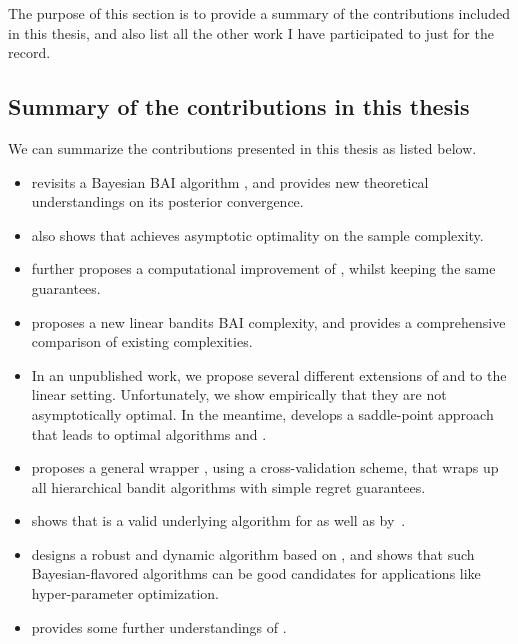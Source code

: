 The purpose of this section is to provide a summary of the contributions included in this thesis, and also list all the other work I have participated to just for the record.

\subsection{Summary of the contributions in this thesis}\label{sec:intro.contributions.summary}

We can summarize the contributions presented in this thesis as listed below.

\begin{itemize}[label=]
    \item \cite{shang2020t3c} revisits a Bayesian BAI algorithm \TTTS, and provides new theoretical understandings on its posterior convergence.
    \item \cite{shang2020t3c} also shows that \TTTS achieves asymptotic optimality on the sample complexity.
    \item \cite{shang2020t3c} further proposes a computational improvement \TCC of \TTTS, whilst keeping the same guarantees.
    \item \cite{degenne2020game} proposes a new linear bandits BAI complexity, and provides a comprehensive comparison of existing complexities.
    \item In an unpublished work, we propose several different extensions of \TTTS and \TCC to the linear setting. Unfortunately, we show empirically that they are not asymptotically optimal. In the meantime, \cite{degenne2020game} develops a saddle-point approach that leads to optimal algorithms \LG and \LGC.
    \item \cite{shang2019adaptive} proposes a general wrapper \GPO, using a cross-validation scheme, that wraps up all hierarchical bandit algorithms with simple regret guarantees.
    \item \cite{shang2018adaptive} shows that \HCT is a valid underlying algorithm for \GPO as well as \POO by~\cite{grill2015poo}.
    \item \cite{shang2019dttts} designs a robust and dynamic algorithm \DTTTS based on \TTTS, and shows that such Bayesian-flavored algorithms can be good candidates for applications like hyper-parameter optimization.
    \item \cite{shang2020dttts} provides some further understandings of \DTTTS.
\end{itemize}

